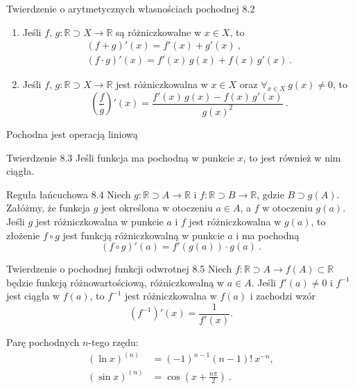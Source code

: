 \documentclass{article}
\newcommand{\R}{\mathbb{R}}
\begin{document}
\begin{twier}{Twierdzenie o arytmetycznych własnościach pochodnej 8.2}
\begin{enumerate}[label=\Roman*.]
    \item Jeśli $f,\, g:\R\supset X\to\R$ są różniczkowalne w $x\in X$, to
    \begin{gather}
        (f+g)'(x)=f'(x)+g'(x)\ ,\\(f\cdot g)'(x)=f'(x)\,g(x)+f(x)\,g'(x)\ .
    \end{gather}
    \item Jeśli $f,\,g:\R\supset X\to\R$ jest różniczkowalna w $x\in X$ oraz $\forall_{x\in X}\ g(x)\neq 0$, to
    \begin{equation*}
        \left(\frac{f}{g}\right)'(x)=\frac{f'(x)\,g(x)-f(x)\,g'(x)}{g(x)^2}\ .
    \end{equation*}
\end{enumerate}
\end{twier}

Pochodna jest operacją liniową

\begin{twier}{Twierdzenie 8.3}
    Jeśli funkcja ma pochodną w punkcie $x$, to jest również w nim ciągła. 
\end{twier}

\begin{twier}{Reguła łańcuchowa 8.4}
Niech $g:\R\supset A\to\R$ i $f:\R\supset B\to\R$, gdzie $B\supset g(A)$.
Załóżmy, że funkcja $g$ jest określona w otoczeniu $a\in A$, a $f$ w otoczeniu $g(a)$.
Jeśli $g$ jest różniczkowalna w punkcie $a$ i $f$ jest różniczkowalna w $g(a)$, to złożenie
$f\circ g$ jest funkcją różniczkowalną w punkcie $a$ i ma pochodną
\begin{equation*}
    (f\circ g)'(a)=f'(g(a))\cdot g(a)\ .
\end{equation*}
\end{twier}

\begin{twier}{Twierdzenie o pochodnej funkcji odwrotnej 8.5}
    Niech $f:\R\supset A\to f(A)\subset \R$ będzie funkcją różnowartościową, różniczkowalną w $a\in A$.
    Jeśli $f'(a)\ne0$ i $f^{-1}$ jest ciągła w $f(a)$, to $f^{-1}$ jest różniczkowalna w $f(a)$ i zachodzi wzór
    \begin{equation*}
        \left( f^{-1} \right)'(x)=\frac{1}{f'(x)}.
    \end{equation*}
\end{twier}
\bigskip

Parę pochodnych $n$-tego rzędu:
\begin{align}
    (\ln{x})^{(n)}&=(-1)^{n-1}(n-1)!\ x^{-n},\\
    (\sin{x})^{(n)}&=\cos{\left(x+\frac{n\pi}{2}\right)}\ .
\end{align}\bigskip
\end{document}
